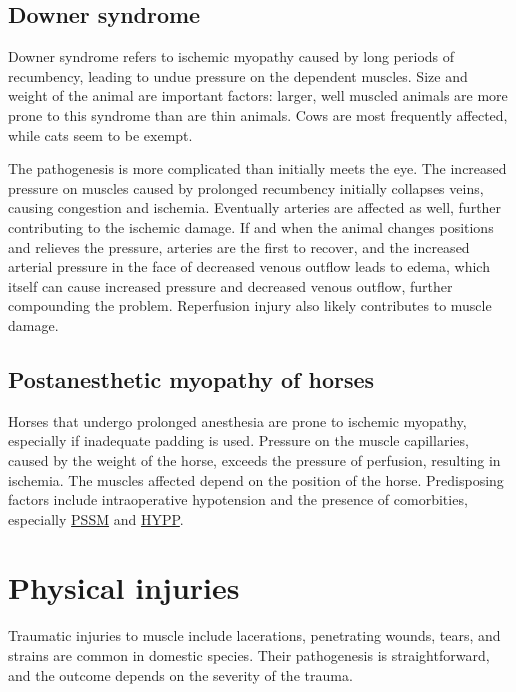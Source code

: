 \documentclass[openany]{book}
\begin{document}
\section{Downer syndrome}\label{downer-syndrome}

Downer syndrome refers to ischemic myopathy caused by long periods of
recumbency, leading to undue pressure on the dependent muscles. Size and
weight of the animal are important factors: larger, well muscled animals
are more prone to this syndrome than are thin animals. Cows are most
frequently affected, while cats seem to be exempt.

The pathogenesis is more complicated than initially meets the eye. The
increased pressure on muscles caused by prolonged recumbency initially
collapses veins, causing congestion and ischemia. Eventually arteries
are affected as well, further contributing to the ischemic damage. If
and when the animal changes positions and relieves the pressure,
arteries are the first to recover, and the increased arterial pressure
in the face of decreased venous outflow leads to edema, which itself can
cause increased pressure and decreased venous outflow, further
compounding the problem. Reperfusion injury also likely contributes to
muscle damage.

\hypertarget{postanesthetic-myopathy-of-horses}{\section{Postanesthetic
myopathy of horses}\label{postanesthetic-myopathy-of-horses}}

Horses that undergo prolonged anesthesia are prone to ischemic myopathy,
especially if inadequate padding is used. Pressure on the muscle
capillaries, caused by the weight of the horse, exceeds the pressure of
perfusion, resulting in ischemia. The muscles affected depend on the
position of the horse. Predisposing factors include intraoperative
hypotension and the presence of comorbities, especially
\protect\hyperlink{equine-polysaccharide-storage-myopathy-pssm}{PSSM}
and \protect\hyperlink{hyperkalemic-periodic-paralysis-hypp}{HYPP}.

\chapter{Physical injuries}\label{physical-injuries}

Traumatic injuries to muscle include lacerations, penetrating wounds,
tears, and strains are common in domestic species. Their pathogenesis is
straightforward, and the outcome depends on the severity of the trauma.
\end{document}
